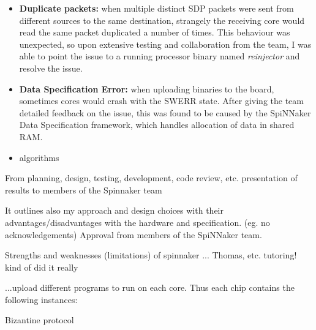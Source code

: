 \begin{itemize}
\item \textbf{Duplicate packets:} when multiple distinct SDP packets were sent from different sources to the same destination, strangely the receiving core would read the same packet duplicated a number of times. This behaviour was unexpected, so upon extensive testing and collaboration from the team, I was able to point the issue to a running processor binary named \textit{reinjector} and resolve the issue. 

\item \textbf{Data Specification Error:} when uploading binaries to the board, sometimes cores would crash with the SWERR state. After giving the team detailed feedback on the issue, this was found to be caused by the SpiNNaker Data Specification framework, which handles allocation of data in shared RAM.

\item algorithms

\end{itemize}

From planning, design, testing, development, code review, etc. presentation of results to members of the Spinnaker team

It outlines also my approach and design choices with their advantages/disadvantages with the hardware and specification. (eg. no acknowledgements)
Approval from members of the SpiNNaker team.

Strengths and weaknesses (limitations) of spinnaker
...
Thomas, etc.
tutoring! kind of did it really

...upload different programs to run on each core.
Thus each chip contains the following instances: 

Bizantine protocol
